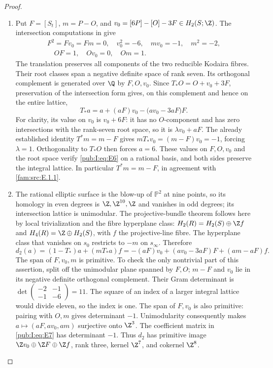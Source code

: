 \begin{proof}
\begin{enumerate}[label=\arabic*.,leftmargin=*]
\item Put $F=[S_t]$, $m=P-O$, and
$v_0=[6P]-[O]-3F\in H_2(S;\Z)$. The intersection computations in
\cite[Lemma~2.1, pp.~3--4]{Engel2026} give
\label{layout:I:2}
\begin{equation}
\begin{gathered}
F^2=Fv_0=Fm=0,\quad v_0^2=-6,\quad mv_0=-1,\quad m^2=-2,
 \\
\quad OF=1,\quad Ov_0=0,\quad Om=1.
\end{gathered}
\label{pub:I:eq:E5}
\end{equation}
The translation preserves all components of the two reducible
Kodaira fibres. Their root classes span a negative definite space of
rank seven. Its orthogonal complement is generated over $\Q$ by
$F,O,v_0$. Since $T_*O=O+v_0+3F$, preservation of the intersection
form gives, on this complement and hence on the entire lattice,
\begin{equation}
 T_*a=a+(aF)v_0-\bigl(av_0-3aF\bigr)F.
\label{pub:I:eq:E6}
\end{equation}
For clarity, its value on $v_0$ is $v_0+6F$: it has no $O$-component
and has zero intersections with the rank-seven root space, so it is
$\lambda v_0+aF$. The already established identity $T^*m=m-F$ gives
$mT_*v_0=(m-F)v_0=-1$, forcing $\lambda=1$. Orthogonality to
$T_*O$ then forces $a=6$. These
values on $F,O,v_0$ and the root space verify \eqref{pub:I:eq:E6} on a rational basis,
and both sides preserve the integral lattice. In particular
$T^*m=m-F$, in agreement with \ref{fam:src:E.1.1}.

\item The rational elliptic surface is the blow-up of $\mathbb P^2$ at nine
points, so its homology in even degrees is $\Z,\Z^{10},\Z$ and
vanishes in odd degrees; its intersection lattice is unimodular.
The projective-bundle theorem follows here by local trivialization
and the fibre hyperplane class: $H_2(R)=H_2(S)\oplus\Z f$ and
$H_4(R)=\Z\oplus H_2(S)$, with $f$ the projective-line fibre.
The hyperplane class that vanishes on $s_0$ restricts to $-m$ on
$s_\infty$. Therefore
\begin{equation}
 d_2(a)=(1-T_*)a+(mT_*a)f
       =-(aF)v_0+(av_0-3aF)F+(am-aF)f.
\label{pub:I:eq:E7}
\end{equation}
The span of $F,v_0,m$ is primitive. To check the only nontrivial
part of this assertion, split off the unimodular plane spanned by
$F,O$; $m-F$ and $v_0$ lie in its negative definite orthogonal
complement. Their Gram determinant is
$\det\left(\begin{smallmatrix}-2&-1\\-1&-6\end{smallmatrix}\right)=11$.
The square of an index of a larger integral lattice would divide
eleven, so the index is one. The span of $F,v_0$ is also primitive:
pairing with $O,m$ gives determinant $-1$. Unimodularity consequently
makes $a\mapsto(aF,av_0,am)$ surjective onto $\Z^3$. The coefficient
matrix in \eqref{pub:I:eq:E7} has determinant $-1$. Thus $d_2$ has primitive image
$\Z v_0\oplus\Z F\oplus\Z f$, rank three, kernel $\Z^7$,
and cokernel $\Z^8$.


\end{enumerate}
\end{proof}
